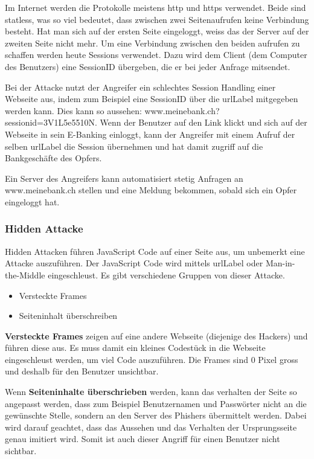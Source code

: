 Im Internet werden die Protokolle meistens http und https verwendet. Beide sind statless, was so viel bedeutet, dass zwischen zwei Seitenaufrufen keine Verbindung besteht. Hat man sich auf der ersten Seite eingeloggt, weiss das der Server auf der zweiten Seite nicht mehr. Um eine Verbindung zwischen den beiden aufrufen zu schaffen werden heute Sessions verwendet. Dazu wird dem Client (dem Computer des Benutzers) eine SessionID übergeben, die er bei jeder Anfrage mitsendet.

Bei der Attacke nutzt der Angreifer ein schlechtes Session Handling einer Webseite aus, indem zum Beispiel eine SessionID über die \Gls{urlLabel} mitgegeben werden kann. Dies kann so aussehen: www.meinebank.ch?sessionid=3V1L5e5510N. Wenn der Benutzer auf den Link klickt und sich auf der Webseite in sein E-Banking einloggt, kann der Angreifer mit einem Aufruf der selben \Gls{urlLabel} die Session übernehmen und hat damit zugriff auf die Bankgeschäfte des Opfers.

Ein Server des Angreifers kann automatisiert stetig Anfragen an www.meinebank.ch stellen und eine Meldung bekommen, sobald sich ein Opfer eingeloggt hat.

\subsubsection{Hidden Attacke}
Hidden Attacken führen JavaScript Code auf einer Seite aus, um unbemerkt eine Attacke auszuführen. Der JavaScript Code wird mittels \Gls{urlLabel} oder Man-in-the-Middle eingeschleust. Es gibt verschiedene Gruppen von dieser Attacke.
\begin{itemize}
\item Versteckte Frames
\item Seiteninhalt überschreiben
\end{itemize}
\textbf{Versteckte Frames} zeigen auf eine andere Webseite (diejenige des Hackers) und führen diese aus. Es muss damit ein kleines Codestück in die Webseite eingeschleust werden, um viel Code auszuführen. Die Frames sind 0 Pixel gross und deshalb für den Benutzer unsichtbar.

Wenn \textbf{Seiteninhalte überschrieben} werden, kann das verhalten der Seite so angepasst werden, dass zum Beispiel Benutzernamen und Passwörter nicht an die gewünschte Stelle, sondern an den Server des Phishers übermittelt werden. Dabei wird darauf geachtet, dass das Aussehen und das Verhalten der Ursprungsseite genau imitiert wird. Somit ist auch dieser Angriff für einen Benutzer nicht sichtbar.

